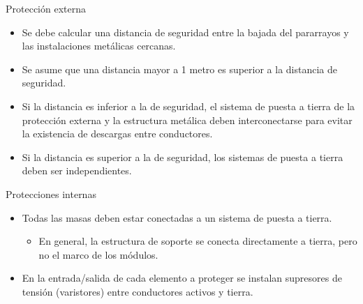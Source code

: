 \documentclass[xcolor={usenames,svgnames,dvipsnames}]{beamer}
\begin{document}
\begin{frame}[label={sec:orgdf3c659}]{Protección externa}
\begin{itemize}
\item Se debe calcular una \alert{distancia de seguridad} entre la bajada del
pararrayos y las instalaciones metálicas cercanas.

\item Se asume que una distancia mayor a 1 metro es superior a la distancia
de seguridad.

\item \alert{Si la distancia es inferior a la de seguridad}, el sistema de puesta
a tierra de la protección externa y la estructura metálica deben
\alert{interconectarse} para evitar la existencia de descargas entre
conductores.

\item \alert{Si la distancia es superior a la de seguridad}, los sistemas de
puesta a tierra deben ser \alert{independientes}.
\end{itemize}
\end{frame}

\begin{frame}[label={sec:org8080c91}]{Protecciones internas}
\begin{itemize}
\item \alert{Todas las masas deben estar conectadas a un sistema de puesta a
tierra}.

\begin{itemize}
\item En general, la estructura de soporte se conecta directamente
a tierra, pero no el marco de los módulos.
\end{itemize}

\item En la entrada/salida de cada elemento a proteger se instalan
\alert{supresores de tensión (varistores)} entre conductores activos y
tierra.
\end{itemize}
\end{frame}
\end{document}
